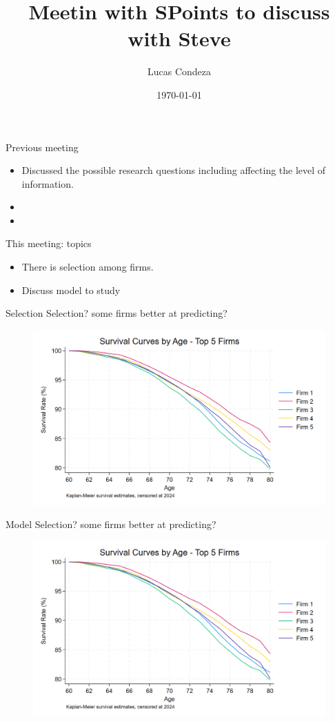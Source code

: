 \documentclass[10pt,aspectratio=169]{beamer}
\title{Meetin with SPoints to discuss with Steve}
\author{%
 Lucas Condeza
\inst{1} \and
}
\institute{
  \inst{1} Yale University \\
}
\date{\today}
\begin{document}






\begin{frame}{Previous meeting}

 \begin{itemize}
        \item Discussed the possible research questions including affecting the level of information. 
        \item  
        \item  
\end{itemize}
\end{frame}


\begin{frame}{This meeting: topics}

 \begin{itemize}
        \item There is selection among firms. 
        \item Discuss model to study 
\end{itemize}
\end{frame}


\begin{frame}{Selection}
Selection? some firms better at predicting? 
 \begin{figure}
     \centering
     \includegraphics[width=0.6\linewidth]{figures//IE4/IE4_survival_curves_by_age_top_firms.png}
     \label{fig:placeholder}
 \end{figure}
\end{frame}


\begin{frame}{Model}
Selection? some firms better at predicting? 
 \begin{figure}
     \centering
     \includegraphics[width=0.6\linewidth]{figures//IE4/IE4_survival_curves_by_age_top_firms.png}
     \label{fig:placeholder}
 \end{figure}
\end{frame}





 
\end{document}
